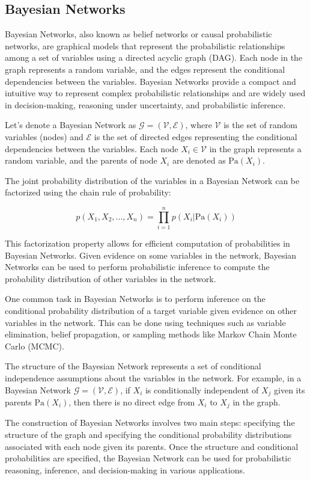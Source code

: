 \documentclass[12pt]{book} %
\begin{document}
\subsection{Bayesian Networks}
Bayesian Networks, also known as belief networks or causal probabilistic networks, are graphical models that represent the probabilistic relationships among a set of variables using a directed acyclic graph (DAG). Each node in the graph represents a random variable, and the edges represent the conditional dependencies between the variables. Bayesian Networks provide a compact and intuitive way to represent complex probabilistic relationships and are widely used in decision-making, reasoning under uncertainty, and probabilistic inference.

Let's denote a Bayesian Network as $\mathcal{G} = (\mathcal{V}, \mathcal{E})$, where $\mathcal{V}$ is the set of random variables (nodes) and $\mathcal{E}$ is the set of directed edges representing the conditional dependencies between the variables. Each node $X_i \in \mathcal{V}$ in the graph represents a random variable, and the parents of node $X_i$ are denoted as $\text{Pa}(X_i)$.

The joint probability distribution of the variables in a Bayesian Network can be factorized using the chain rule of probability:

\[
p(X_1, X_2, ..., X_n) = \prod_{i=1}^{n} p(X_i | \text{Pa}(X_i))
\]

This factorization property allows for efficient computation of probabilities in Bayesian Networks. Given evidence on some variables in the network, Bayesian Networks can be used to perform probabilistic inference to compute the probability distribution of other variables in the network.

One common task in Bayesian Networks is to perform inference on the conditional probability distribution of a target variable given evidence on other variables in the network. This can be done using techniques such as variable elimination, belief propagation, or sampling methods like Markov Chain Monte Carlo (MCMC).

The structure of the Bayesian Network represents a set of conditional independence assumptions about the variables in the network. For example, in a Bayesian Network $\mathcal{G} = (\mathcal{V}, \mathcal{E})$, if $X_i$ is conditionally independent of $X_j$ given its parents $\text{Pa}(X_i)$, then there is no direct edge from $X_i$ to $X_j$ in the graph.

The construction of Bayesian Networks involves two main steps: specifying the structure of the graph and specifying the conditional probability distributions associated with each node given its parents. Once the structure and conditional probabilities are specified, the Bayesian Network can be used for probabilistic reasoning, inference, and decision-making in various applications.
\end{document}
